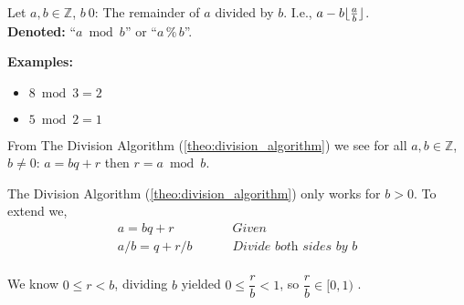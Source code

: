 \begin{Def}

    \label{def:mod_operator}

    Let $a,b\in\mathbb{Z}$, $b\>0$: The remainder of $a$ divided by $b$. I.e., $a-b\lfloor\frac{a}{b}\rfloor$.\\

    \noindent
    \textbf{Denoted:} ``$a\bmod b$'' or ``$a\,\%\,b$''.
\end{Def}

\noindent
\textbf{Examples:}
\begin{itemize}
    \item $8\bmod3=2$
    \item $5\bmod2=1$
\end{itemize}

\noindent
From The Division Algorithm (\ref{theo:division_algorithm}) we see for all $a,b\in\mathbb{Z}$, $b\neq0$:
$a=bq+r$ then $r=a\bmod b$.

\begin{Proof}
    The Division Algorithm (\ref{theo:division_algorithm}) only works for $b>0$. To extend we,
    \begin{align*}
        a=bq+r \quad \quad    & \textit{ Given}                    \\
        a/b=q+r/b \quad \quad & \textit{ Divide both sides by $b$} \\
    \end{align*}

    \vspace{-3em}
    \begin{center}
        We know $0\leq r<b$, dividing $b$ yielded $0\leq \dfrac{r}{b}<1$, so $\dfrac{r}{b}\in[0,1)$ .
    \end{center}
\end{Proof}





